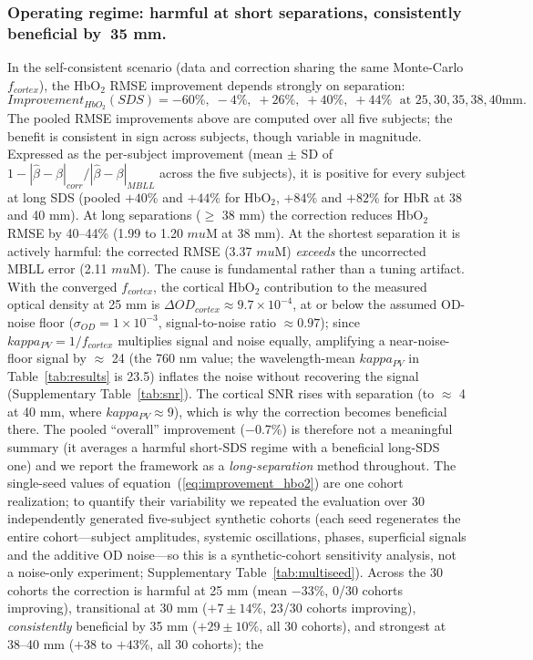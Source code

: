 \documentclass[11pt]{article}
\def\kappa{kappa}%
\def\mu{mu}%
\def\sim{~}%
\def\mathrm#1{#1}%
\def\,{ }%
\begin{document}
\subsubsection{Operating regime: harmful at short separations, consistently beneficial by \texorpdfstring{$\sim$35\,mm}{~35 mm}.}
\label{sec:scope}
In the self-consistent scenario (data and correction sharing the same Monte-Carlo $f_{\mathrm{cortex}}$), the HbO$_2$ RMSE improvement depends strongly on separation:
\begin{equation}
\mathrm{Improvement}_{\mathrm{HbO_2}}(\mathrm{SDS}) = -60\%,\; -4\%,\; +26\%,\; +40\%,\; +44\%\;\text{ at } 25, 30, 35, 38, 40\,\text{mm.}
\label{eq:improvement_hbo2}
\end{equation}
The pooled RMSE improvements above are computed over all five subjects; the benefit is consistent in sign across subjects, though variable in magnitude. Expressed as the per-subject improvement (mean\,$\pm$\,SD of $1-|\hat{\beta}-\beta|_{\mathrm{corr}}/|\hat{\beta}-\beta|_{\mathrm{MBLL}}$ across the five subjects), it is positive for every subject at long SDS (pooled $+40\%$ and $+44\%$ for HbO$_2$, $+84\%$ and $+82\%$ for HbR at 38 and 40\,mm). At long separations ($\geq$\,38\,mm) the correction reduces HbO$_2$ RMSE by 40--44\% (1.99 to 1.20\,$\mu$M at 38\,mm). At the shortest separation it is actively harmful: the corrected RMSE (3.37\,$\mu$M) \emph{exceeds} the uncorrected MBLL error (2.11\,$\mu$M). The cause is fundamental rather than a tuning artifact. With the converged $f_{\mathrm{cortex}}$, the cortical HbO$_2$ contribution to the measured optical density at 25\,mm is $\Delta\mathrm{OD}_{\mathrm{cortex}} \approx 9.7\times10^{-4}$, at or below the assumed OD-noise floor ($\sigma_{\mathrm{OD}} = 1\times10^{-3}$, signal-to-noise ratio $\approx 0.97$); since $\kappa_{\mathrm{PV}} = 1/f_{\mathrm{cortex}}$ multiplies signal and noise equally, amplifying a near-noise-floor signal by $\approx$\,24 (the 760\,nm value; the wavelength-mean $\kappa_{\mathrm{PV}}$ in Table~\ref{tab:results} is 23.5) inflates the noise without recovering the signal (Supplementary Table~\ref{tab:snr}). The cortical SNR rises with separation (to $\approx$\,4 at 40\,mm, where $\kappa_{\mathrm{PV}} \approx 9$), which is why the correction becomes beneficial there. The pooled ``overall'' improvement ($-$0.7\%) is therefore not a meaningful summary (it averages a harmful short-SDS regime with a beneficial long-SDS one) and we report the framework as a \emph{long-separation} method throughout. The single-seed values of equation~(\ref{eq:improvement_hbo2}) are one cohort realization; to quantify their variability we repeated the evaluation over 30 independently generated five-subject synthetic cohorts (each seed regenerates the entire cohort---subject amplitudes, systemic oscillations, phases, superficial signals and the additive OD noise---so this is a synthetic-cohort sensitivity analysis, not a noise-only experiment; Supplementary Table~\ref{tab:multiseed}). Across the 30 cohorts the correction is harmful at 25\,mm (mean $-$33\%, 0/30 cohorts improving), transitional at 30\,mm ($+7\pm14\%$, 23/30 cohorts improving), \emph{consistently} beneficial by 35\,mm ($+29\pm10\%$, all 30 cohorts), and strongest at 38--40\,mm ($+38$ to $+43\%$, all 30 cohorts); the 
\end{document}

